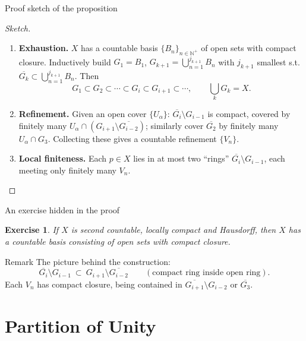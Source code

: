 \documentclass[10pt]{beamer}
\newtheorem{exercise}{Exercise}
\newcommand{\N}{\mathbb{N}}
\begin{document}
\begin{frame}{Proof sketch of the proposition}
	\begin{proof}[Sketch]
		\begin{enumerate}
			\item \textbf{Exhaustion.} $X$ has a countable basis
			      $\{B_n\}_{n \in \N^+}$ of open sets with compact closure.
			      Inductively build $G_1 = B_1$,
			      $G_{k+1} = \bigcup_{n=1}^{j_{k+1}} B_n$ with $j_{k+1}$
			      smallest s.t.\ $\overline{G_k} \subset
				      \bigcup_{n=1}^{j_{k+1}} B_n$. Then
			      \[
				      G_1 \subset G_2 \subset \cdots \subset G_i \subset G_{i+1}
				      \subset \cdots, \qquad \textstyle\bigcup_k G_k = X .
			      \]
			\item \textbf{Refinement.} Given an open cover $\{U_\alpha\}$:
			      $\overline{G_i} \setminus G_{i-1}$ is compact, covered by
			      finitely many $U_\alpha \cap (G_{i+1} \setminus
				      \overline{G_{i-2}})$; similarly cover $\overline{G_2}$ by
			      finitely many $U_\alpha \cap G_3$. Collecting these gives
			      a countable refinement $\{V_n\}$.
			\item \textbf{Local finiteness.} Each $p \in X$ lies in at most two
			      ``rings'' $\overline{G_i} \setminus G_{i-1}$, each meeting
			      only finitely many $V_n$.
		\end{enumerate}
	\end{proof}
\end{frame}

\begin{frame}{An exercise hidden in the proof}
	\begin{exercise}
		If $X$ is second countable, locally compact and Hausdorff, then $X$
		has a countable basis consisting of open sets with compact closure.
	\end{exercise}
	\begin{block}{Remark}
		The picture behind the construction:
		\[
			\overline{G_i} \setminus G_{i-1}
			\ \subset\
			G_{i+1} \setminus \overline{G_{i-2}}
			\qquad (\text{compact ring inside open ring}).
		\]
		Each $V_n$ has compact closure, being contained in
		$\overline{G_{i+1}} \setminus G_{i-2}$ or $\overline{G_3}$.
	\end{block}
\end{frame}

\section{Partition of Unity}
\end{document}
